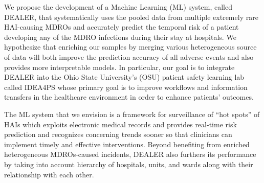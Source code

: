 

We propose the development of a Machine Learning (ML) system, called DEALER, that systematically uses the pooled data from multiple extremely rare HAI-causing MDROs and accurately predict the temporal risk of a patient developing any of the MDRO infections during their stay at hospitals. We hypothesize that enriching our samples by merging various heterogeneous source of data will both improve the prediction accuracy of all adverse events and also provides more interpretable models. In particular, our goal is to integrate DEALER into the Ohio State University's (OSU) patient safety learning lab called IDEA4PS whose primary goal is to improve workflows and information transfers in the healthcare environment in order to enhance patients' outcomes.

The ML system that we envision is a framework for surveillance of ``hot spots'' of HAIs which exploits electronic medical records and provides real-time risk prediction and recognizes concerning trends sooner so that clinicians can implement timely and effective interventions. Beyond benefiting from enriched heterogeneous MDROs-caused incidents, DEALER also furthers its performance by taking into account hierarchy of hospitals, units, and wards along with their relationship with each other.

